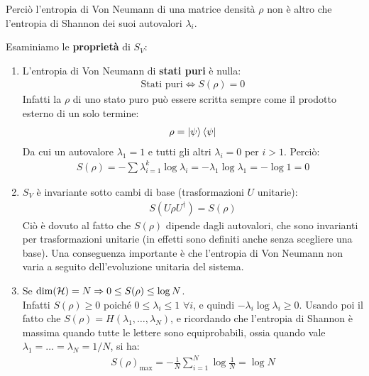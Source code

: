 \documentclass[../../InformazioneQuantistica.tex]{subfiles}
\begin{document}
Perciò l'entropia di Von Neumann di una matrice densità $\rho$ non è altro che l'entropia di Shannon dei suoi autovalori $\lambda_i$.\\
\begin{comment}
Per esempio, se prendiamo $\rho$ come una mistura statistica di $1$ qubit, cioè $\rho=p\ket{0}\bra{0} + (1-p)\ket{1}\bra{1}$ (ciò equivale a una mistura \q{classica} dei due stati), otterremo:
\begin{align*}
S(\rho) = -p\log p-(1-p)\log p=-\log p
\end{align*}
\end{comment}

Esaminiamo le \textbf{proprietà} di $S_V$:
\begin{enumerate}
\item L'entropia di Von Neumann di \textbf{stati puri} è nulla:
\begin{align*}
\text{Stati puri} \Leftrightarrow S(\rho)=0
\end{align*}
Infatti la $\rho$ di uno stato puro può essere scritta sempre come il prodotto esterno di un solo termine:
\begin{align*}
\rho=\Ket{\psi}\Bra{\psi}
\end{align*}
Da cui un autovalore $\lambda_1=1$ e tutti gli altri $\lambda_i = 0$ per $i>1$. Perciò:
\begin{align*}
S(\rho) = -\sum \lambda_{i=1}^k \log \lambda_i = -\lambda_1 \log \lambda_1 = -\log 1 = 0
\end{align*}
\item $S_V$ è invariante sotto cambi di base (trasformazioni $U$ unitarie):
\begin{align*}
S(U\rho U^\dag ) = S(\rho)
\end{align*}
Ciò è dovuto al fatto che $S(\rho)$ dipende dagli autovalori, che sono invarianti per trasformazioni unitarie (in effetti sono definiti anche senza scegliere una base). Una conseguenza importante è che l'entropia di Von Neumann non varia a seguito dell'evoluzione unitaria del sistema.
\item Se $\operatorname{dim}(\mathcal{H})=N \Rightarrow  0\leq S(\rho)\leq \log N$.\\
Infatti $S(\rho) \geq 0$ poiché $0\leq \lambda_i \leq 1$ $\forall i$, e quindi $-\lambda_i \log \lambda_i \geq 0$. Usando poi il fatto che $S(\rho) = H(\lambda_1, \dots, \lambda_N)$, e ricordando che l'entropia di Shannon è massima quando tutte le lettere sono equiprobabili, ossia quando vale $\lambda_1 = \dots = \lambda_N = 1/N$, si ha:
\begin{align*}
S(\rho)_{\max} = -\frac{1}{N}\sum_{i=1}^N \log \frac{1}{N} = \log N
\end{align*}
\end{enumerate}
\end{document}
